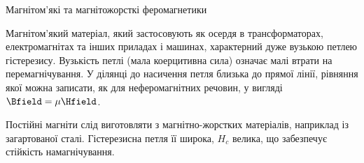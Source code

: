 \documentclass[onlytextwidth]{beamer}
\begin{document}
\begin{frame}{Магнітом'які та магнітожорсткі феромагнетики}{}
       \begin{block}{}\justifying
\alert{Магнітом'який} матеріал, який застосовують як осердя в трансформаторах, електромагнітах та інших приладах і машинах, характерний дуже вузькою
петлею гістерезису. Вузькість петлі (мала коерцитивна сила) означає малі втрати на перемагнічування. У ділянці до насичення петля близька до прямої
лінії, рівняння якої можна записати, як для неферомагнітних речовин, у вигляді $\Bfield = \mu\Hfield$.
\end{block}

\begin{block}{}\justifying
Постійні магніти слід виготовляти з магнітно-жорстких матеріалів, наприклад із загартованої сталі. Гістерезисна петля її широка, $H_c$ велика, що
забезпечує стійкість намагнічування.
\end{block}
\end{frame}
\end{document}
